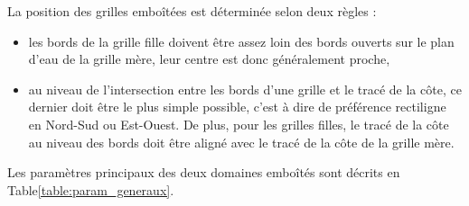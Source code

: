 \documentclass[10pt,a4paper,titlepage]{article}
\begin{document}
La position des grilles emboîtées est déterminée selon deux règles :
\begin{itemize}
    \item les bords de la grille fille doivent être assez loin des bords ouverts sur le plan d'eau de la grille mère, leur centre est donc généralement proche,
    \item au niveau de l'intersection entre les bords d'une grille et le tracé de la côte, ce dernier doit être le plus simple possible, c'est à dire de préférence rectiligne en Nord-Sud ou Est-Ouest.
    De plus, pour les grilles filles, le tracé de la côte au niveau des bords doit être aligné avec le tracé de la côte de la grille mère.
\end{itemize}

Les paramètres principaux des deux domaines emboîtés sont décrits en Table\ref{table:param_generaux}.
\end{document}
